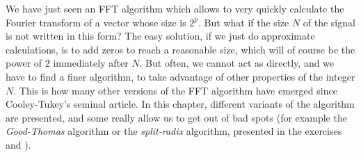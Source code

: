  
 We have just seen an FFT algorithm which allows to very quickly calculate the Fourier transform of a vector whose size is $ 2^p $. But what if the size $N$ of the signal is not written in this form? The easy solution, if we just do approximate calculations, is to add zeros to reach a reasonable size, which will of course be the power of $ 2 $ immediately after $N$. But often, we cannot act as directly, and we have to find a finer algorithm, to take advantage of other properties of the integer $N$. This is how many other versions of the FFT algorithm have emerged since Cooley-Tukey's seminal article. In this chapter, different variants of the algorithm are presented, and some really allow us to get out of bad spots (for example the \textit{Good-Thomas} algorithm or the \textit{split-radix} algorithm, presented in the exercises  and ).
 

